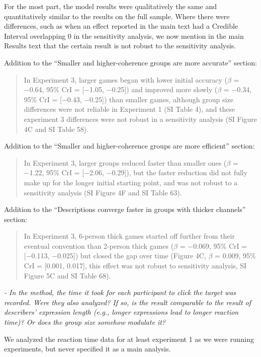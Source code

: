 \documentclass{stanfordletter}
\newcommand{\theysaid}[1]{\begin{leftbar} \noindent 
		\textsl{ #1}\end{leftbar}}
\newcommand{\revised}[1]{\begin{quote}	#1 \end{quote}}
\begin{document}
\begin{letter}{}
          For the most part, the model results were qualitatively the same and quantitatively similar to the results on the full sample. Where there were differences, such as when an effect reported in the main text had a Credible Interval overlapping 0 in the sensitivity analysis, we now mention in the main Results text that the certain result is not robust to the sensitivity analysis. 


          Addition to the ``Smaller and higher-coherence groups are more accurate'' section: 
          \revised{In Experiment 3, larger games began with
          	lower initial accuracy ($\beta$ = −0.64, 95\% CrI = [−1.05, −0.25]) and improved more slowly ($\beta$ =
          	−0.34, 95\% CrI = [−0.43, −0.25]) than smaller games, although group size differences were not
          	reliable in Experiment 1 (SI Table 4), and these experiment 3 differences were not robust in a 
          	sensitivity	analysis (SI	Figure 4C and SI Table 58).}
          
          
          Addition to the ``Smaller and higher-coherence groups are more efficient'' section: 
          \revised{In
          	Experiment 3, larger groups reduced faster than smaller ones ($\beta$ = −1.22, 95\% CrI = [−2.06, −0.29]),
          	but the faster reduction did not fully make up for the longer initial starting point, and was not robust to a sensitivity analysis (SI Figure 4F and SI Table
          	63).}
          	
          	Addition to the ``Descriptions converge faster in groups with thicker channels'' section: 
          	\revised{In Experiment 3, 6-person thick games started off further
          		from their eventual convention than 2-person thick games ($\beta$ = −0.069, 95\% CrI = [−0.113, −0.025])
          		but closed the gap over time (Figure 4C, $\beta$ = 0.009, 95\% CrI = [0.001, 0.017], this effect was not robust to sensitivity analysis,
          		SI Figure 5C and SI Table 68).}
          	
          \theysaid{- In the method, the time it took for each participant to click the target was recorded. Were they also analyzed? If so, is the result comparable to the result of describers' expression length (e.g., longer expressions lead to longer reaction time)? Or does the group size somehow modulate it?}
          
          
          We analyzed the reaction time data for at least experiment 1 as we were running experiments, but never specified it as a main analysis. 
          

\end{letter}
\end{document}
